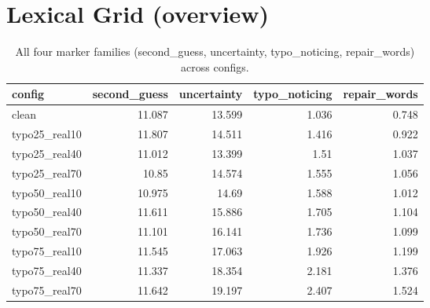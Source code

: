 \documentclass[11pt]{article}
\begin{document}
\section*{Lexical Grid (overview)}
\begin{table}[H]
\centering
\caption{All four marker families (second\_guess, uncertainty, typo\_noticing, repair\_words) across configs.}
\small
\begin{adjustbox}{max width=\textwidth}
\begin{tabular}{lrrrr}
\toprule
\textbf{config} & \textbf{second\_guess} & \textbf{uncertainty} & \textbf{typo\_noticing} & \textbf{repair\_words} \\
\midrule
clean & 11.087 & 13.599 & 1.036 & 0.748 \\
typo25\_real10 & 11.807 & 14.511 & 1.416 & 0.922 \\
typo25\_real40 & 11.012 & 13.399 & 1.51 & 1.037 \\
typo25\_real70 & 10.85 & 14.574 & 1.555 & 1.056 \\
typo50\_real10 & 10.975 & 14.69 & 1.588 & 1.012 \\
typo50\_real40 & 11.611 & 15.886 & 1.705 & 1.104 \\
typo50\_real70 & 11.101 & 16.141 & 1.736 & 1.099 \\
typo75\_real10 & 11.545 & 17.063 & 1.926 & 1.199 \\
typo75\_real40 & 11.337 & 18.354 & 2.181 & 1.376 \\
typo75\_real70 & 11.642 & 19.197 & 2.407 & 1.524 \\
\bottomrule
\end{tabular}
\end{adjustbox}
\end{table}
\end{document}
